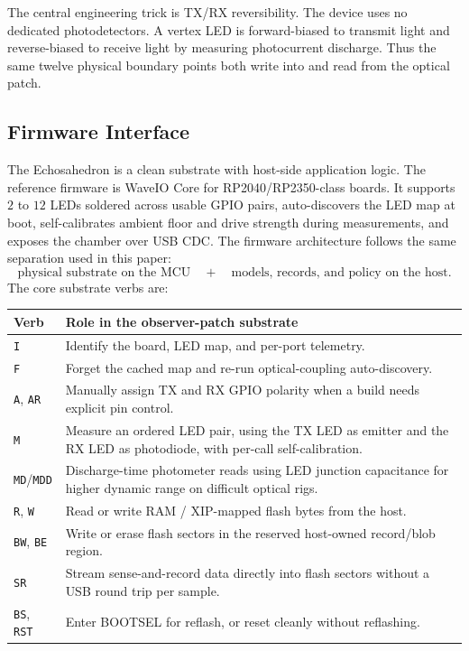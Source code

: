 \documentclass[11pt]{article}
\theoremstyle{remark}
\theoremstyle{plain}
\begin{document}
The central engineering trick is TX/RX reversibility. The device uses no dedicated photodetectors. A vertex LED is forward-biased to transmit light and reverse-biased to receive light by measuring photocurrent discharge. Thus the same twelve physical boundary points both write into and read from the optical patch.

\subsection{Firmware Interface}

The Echosahedron is a clean substrate with host-side application logic. The reference firmware is WaveIO Core for RP2040/RP2350-class boards. It supports \(2\) to \(12\) LEDs soldered across usable GPIO pairs, auto-discovers the LED map at boot, self-calibrates ambient floor and drive strength during measurements, and exposes the chamber over USB CDC. The firmware architecture follows the same separation used in this paper:
\[
\boxed{
\text{physical substrate on the MCU}
\quad+\quad
\text{models, records, and policy on the host}.
}
\]
The core substrate verbs are:

\begin{longtable}{L{0.20\textwidth}L{0.70\textwidth}}
\toprule
\textbf{Verb} & \textbf{Role in the observer-patch substrate} \\
\midrule
\endhead
\texttt{I} & Identify the board, LED map, and per-port telemetry. \\
\texttt{F} & Forget the cached map and re-run optical-coupling auto-discovery. \\
\texttt{A}, \texttt{AR} & Manually assign TX and RX GPIO polarity when a build needs explicit pin control. \\
\texttt{M} & Measure an ordered LED pair, using the TX LED as emitter and the RX LED as photodiode, with per-call self-calibration. \\
\texttt{MD}/\texttt{MDD} & Discharge-time photometer reads using LED junction capacitance for higher dynamic range on difficult optical rigs. \\
\texttt{R}, \texttt{W} & Read or write RAM / XIP-mapped flash bytes from the host. \\
\texttt{BW}, \texttt{BE} & Write or erase flash sectors in the reserved host-owned record/blob region. \\
\texttt{SR} & Stream sense-and-record data directly into flash sectors without a USB round trip per sample. \\
\texttt{BS}, \texttt{RST} & Enter BOOTSEL for reflash, or reset cleanly without reflashing. \\
\bottomrule
\end{longtable}
\end{document}
